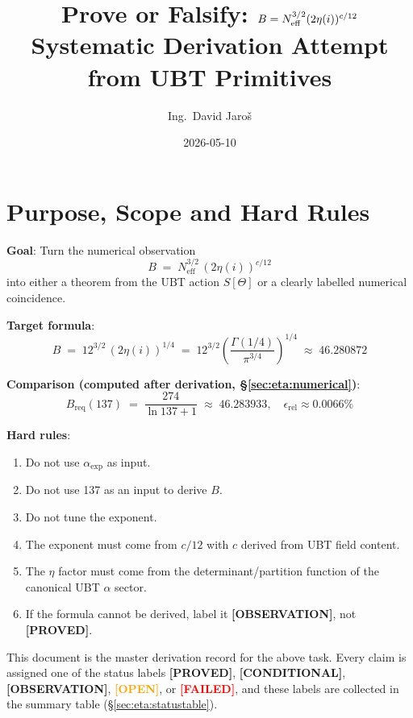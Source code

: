 \documentclass[12pt,a4paper]{article}
\title{\textbf{Prove or Falsify: $B = \Neff^{3/2}(2\eta(i))^{c/12}$}\\[4pt]
         \large Systematic Derivation Attempt from UBT Primitives}
\author{Ing.\ David Jaro\v{s}}
\date{2026-05-10}
\theoremstyle{definition}
\theoremstyle{remark}
\newcommand{\PROVED}{\textcolor{green!60!black}{\textbf{[PROVED]}}}
\newcommand{\CONDITIONAL}{\textcolor{blue!70!black}{\textbf{[CONDITIONAL]}}}
\newcommand{\OBSERVATION}{\textcolor{violet!80!black}{\textbf{[OBSERVATION]}}}
\newcommand{\OPEN}{\textcolor{orange}{\textbf{[OPEN]}}}
\newcommand{\FAILED}{\textcolor{red}{\textbf{[FAILED]}}}
\newcommand{\Neff}{N_{\mathrm{eff}}}
\newcommand{\Breq}{B_{\mathrm{req}}}
\begin{document}
  \maketitle
  \tableofcontents
  \bigskip
\fi

\section{Purpose, Scope and Hard Rules}
\label{sec:eta:purpose}

\begin{tcolorbox}[colback=yellow!6!white, colframe=orange!70!black,
                  title=\textbf{Task: prove\_or\_falsify\_eta\_i\_alpha\_coefficient}]
\textbf{Goal}: Turn the numerical observation
\[
  B \;=\; \Neff^{3/2}\,(2\eta(i))^{c/12}
\]
into either a theorem from the UBT action $S[\Theta]$ or a clearly labelled
numerical coincidence.

\smallskip
\noindent\textbf{Target formula}:
\[
  B \;=\; 12^{3/2}\,(2\eta(i))^{1/4}
    \;=\; 12^{3/2}\!\left(\frac{\Gamma(1/4)}{\pi^{3/4}}\right)^{\!1/4}
    \;\approx\; 46.280872
\]

\smallskip
\noindent\textbf{Comparison (computed after derivation, §\ref{sec:eta:numerical})}:
\[
  \Breq(137) \;=\; \frac{274}{\ln 137 + 1} \;\approx\; 46.283933,
  \quad \epsilon_{\mathrm{rel}} \approx 0.0066\%
\]

\smallskip
\noindent\textbf{Hard rules}:
\begin{enumerate}
  \item Do not use $\alpha_{\exp}$ as input.
  \item Do not use 137 as an input to derive $B$.
  \item Do not tune the exponent.
  \item The exponent must come from $c/12$ with $c$ derived from UBT field content.
  \item The $\eta$ factor must come from the determinant/partition function of
        the canonical UBT $\alpha$ sector.
  \item If the formula cannot be derived, label it \OBSERVATION, not \PROVED.
\end{enumerate}
\end{tcolorbox}

This document is the master derivation record for the above task.  Every
claim is assigned one of the status labels \PROVED, \CONDITIONAL, \OBSERVATION,
\OPEN, or \FAILED, and these labels are collected in the summary table
(§\ref{sec:eta:statustable}).
\end{document}
